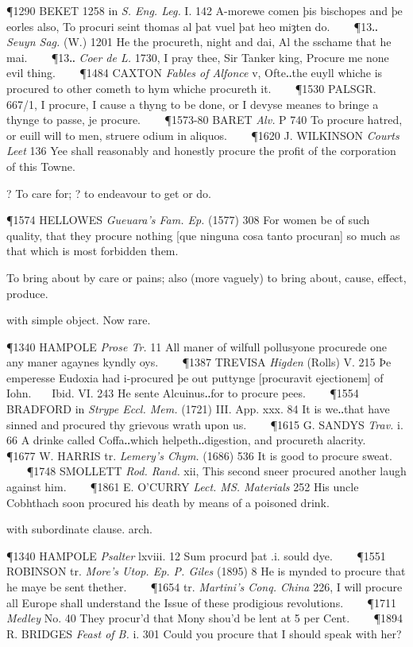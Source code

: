 \begin{description}[wide, labelwidth=!, labelindent=0pt]
\begin{myenumerate}
\P 1290 BEKET 1258 in  \textit{S. Eng. Leg.} I. 142 A-morewe comen þis bischopes and þe eorles also, To procuri seint thomas al þat vuel þat heo miȝten do.    
\P 13‥ \textit{Seuyn Sag.} (W.) 1201 He the  procureth, night and dai, Al the sschame that he mai.    
\P 13‥ \textit{Coer de L.} 1730, I pray thee, Sir Tanker king, Procure me none evil thing.    
\P 1484 CAXTON  \textit{Fables of Alfonce} v, Ofte‥the euyll whiche is procured to other cometh to hym whiche procureth it.    
\P 1530 PALSGR. 667/1, I procure, I cause a thyng to be done, or I devyse meanes to bringe a thynge to passe, je procure.    
\P 1573-80 BARET  \textit{Alv.} P 740 To procure hatred, or euill will to men, struere odium in aliquos.    
\P 1620 J. WILKINSON  \textit{Courts Leet} 136 Yee shall reasonably and honestly procure the profit of the corporation of this Towne.

 ? To care for; ? to endeavour to get or do.

\P 1574 HELLOWES  \textit{Gueuara's Fam. Ep.} (1577) 308 For women be of such quality, that they procure nothing [que ninguna cosa tanto procuran] so much as that which is most forbidden them.

 To bring about by care or pains; also (more vaguely) to bring about, cause, effect, produce. 

 with simple object. Now rare.

\P 1340 HAMPOLE  \textit{Prose Tr.} 11 All maner of wilfull pollusyone procurede one any maner agaynes kyndly oys.    
\P 1387 TREVISA  \textit{Higden} (Rolls) V. 215 Þe emperesse Eudoxia had i-procured þe out puttynge [procuravit ejectionem] of Iohn.    Ibid. VI. 243 He sente Alcuinus‥for to procure pees.    
\P 1554 BRADFORD in  \textit{Strype Eccl. Mem.} (1721) III. App. xxx. 84 It is we‥that have sinned and procured thy grievous wrath upon us.    
\P 1615 G. SANDYS  \textit{Trav.} i. 66 A drinke called Coffa‥which helpeth‥digestion, and procureth alacrity.    
\P 1677 W. HARRIS tr. \textit{Lemery's Chym.} (1686) 536 It is good to procure sweat.    
\P 1748 SMOLLETT  \textit{Rod. Rand.} xii, This second sneer procured another laugh against him.    
\P 1861 E. O'CURRY  \textit{Lect. MS. Materials} 252 His uncle Cobhthach soon procured his death by means of a poisoned drink.

 with subordinate clause. arch.

\P 1340 HAMPOLE  \textit{Psalter} lxviii. 12 Sum procurd þat .i. sould dye.    
\P 1551 ROBINSON tr.  \textit{More's Utop. Ep. P. Giles} (1895) 8 He is mynded to procure that he maye be sent thether.    
\P 1654 tr.  \textit{Martini's Conq. China} 226, I will procure all Europe shall understand the Issue of these prodigious revolutions.    
\P 1711 \textit{Medley}  No. 40 They procur'd that Mony shou'd be lent at 5 per Cent.    
\P 1894 R. BRIDGES  \textit{Feast of B.} i. 301 Could you procure that I should speak with her?


\end{myenumerate}
\end{description}
